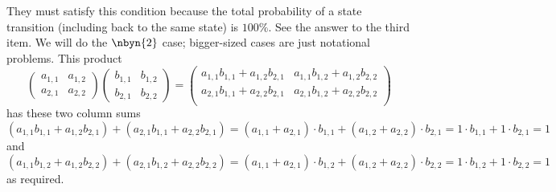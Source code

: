 \begin{ans}{7}
      \begin{exparts}
        \partsitem They must satisfy this condition because the total
          probability of a state transition (including back to the
          same state) is $100\%$.
        \partsitem See the answer to the third item.
        \partsitem We will
          do the $\nbyn{2}$ case; bigger-sized cases are just notational
          problems.
          This product
          \begin{equation*}
            \begin{pmatrix}
              a_{1,1}  &a_{1,2}  \\
              a_{2,1}  &a_{2,2}
            \end{pmatrix}
            \begin{pmatrix}
              b_{1,1}  &b_{1,2}  \\
              b_{2,1}  &b_{2,2}
            \end{pmatrix}
            =\begin{pmatrix}
              a_{1,1}b_{1,1}+a_{1,2}b_{2,1}  &a_{1,1}b_{1,2}+a_{1,2}b_{2,2} \\
              a_{2,1}b_{1,1}+a_{2,2}b_{2,1}  &a_{2,1}b_{1,2}+a_{2,2}b_{2,2} \\
            \end{pmatrix}
           \end{equation*}
            has these two column sums
            \begin{equation*}
              (a_{1,1}b_{1,1}+a_{1,2}b_{2,1})
              +(a_{2,1}b_{1,1}+a_{2,2}b_{2,1})
              =(a_{1,1}+a_{2,1})\cdot b_{1,1}
                +(a_{1,2}+a_{2,2})\cdot b_{2,1}
              =1\cdot b_{1,1}+1\cdot b_{2,1}
              =1
            \end{equation*}
            and
            \begin{equation*}
              (a_{1,1}b_{1,2}+a_{1,2}b_{2,2})
              +(a_{2,1}b_{1,2}+a_{2,2}b_{2,2})
              =(a_{1,1}+a_{2,1})\cdot b_{1,2}
                +(a_{1,2}+a_{2,2})\cdot b_{2,2}
              =1\cdot b_{1,2}+1\cdot b_{2,2}
              =1
            \end{equation*}
            as required.
      \end{exparts}
    
\end{ans}

